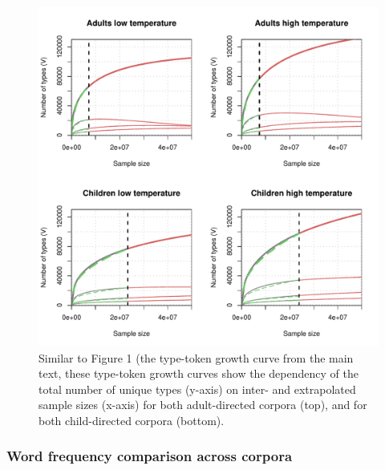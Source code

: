 \documentclass[doc, a4paper]{apa7}
\begin{document}
\begin{figure}[!htbp]
  \centering
    \includegraphics[scale=.8]{figures/vgc_plots_grid.pdf}
    \caption{Similar to Figure 1 (the type-token growth curve from the main text, these type-token growth curves show the dependency of the total number of unique types (y-axis) on inter- and extrapolated sample sizes (x-axis) for both adult-directed corpora (top), and for both child-directed corpora (bottom).}
    \label{fig:df.growth.intrextr2}
  \hfill
\end{figure}

\clearpage  


\subsubsection{Word frequency comparison across corpora}
\end{document}
